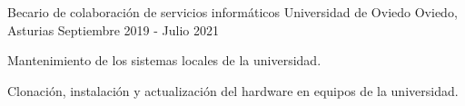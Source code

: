 \begin{cventries}
    \cventry
    {Becario de colaboración de servicios informáticos} %
    {Universidad de Oviedo} %
    {Oviedo, Asturias} %
    {Septiembre 2019 - Julio 2021} %
    {
        \begin{cvitems} %
            \item {Mantenimiento de los sistemas locales de la universidad.}
            \item {Clonación, instalación y actualización del hardware en equipos de la universidad.}
        \end{cvitems}
    }

\end{cventries}
